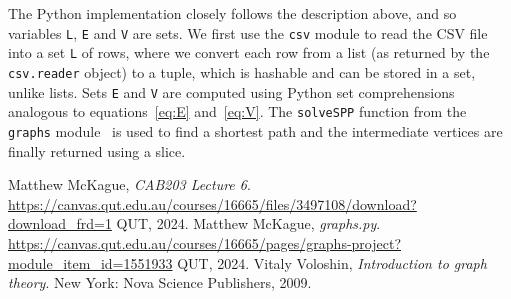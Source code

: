 \documentclass[a4paper]{article}
\begin{document}
The Python implementation closely follows the description above, and so variables \verb+L+, \verb+E+ and \verb+V+ are sets.  We first use the \verb+csv+ module to read the CSV file into a set \verb+L+ of rows, where we convert each row from a list (as returned by the \verb+csv.reader+ object) to a tuple, which is hashable and can be stored in a set, unlike lists.  Sets \verb+E+ and \verb+V+ are computed using Python set comprehensions analogous to equations~\eqref{eq:E} and~\eqref{eq:V}.  The \verb+solveSPP+ function from the \verb+graphs+ module~\cite{cab203graphs.py} is used to find a shortest path and the intermediate vertices are finally returned using a slice.


\begin{thebibliography}{9}
        Matthew McKague,
        \emph{CAB203 Lecture 6}.
        \url{https://canvas.qut.edu.au/courses/16665/files/3497108/download?download_frd=1}
        QUT, 2024.
        Matthew McKague,
        \emph{graphs.py}.
        \url{https://canvas.qut.edu.au/courses/16665/pages/graphs-project?module_item_id=1551933}
        QUT, 2024.
        Vitaly Voloshin,
        \emph{Introduction to graph theory}.
        New York: Nova Science Publishers, 2009.
\end{thebibliography}
\end{document}
